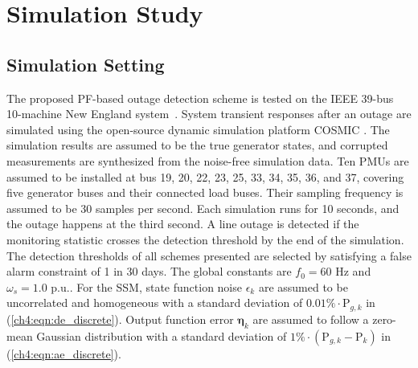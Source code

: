 \section{Simulation Study}
\label{ch4:sec:results}
\subsection{Simulation Setting}
The proposed PF-based outage detection scheme is tested on the IEEE 39-bus 10-machine New England system~\cite{athay1979practical}. System transient responses after an outage are simulated using the open-source dynamic simulation platform COSMIC \cite{Song2016}. The simulation results are assumed to be the true generator states, and corrupted measurements are synthesized from the noise-free simulation data. Ten PMUs are assumed to be installed at bus 19, 20, 22, 23, 25, 33, 34, 35, 36, and 37, covering five generator buses and their connected load buses. Their sampling frequency is assumed to be 30 samples per second. Each simulation runs for 10 seconds, and the outage happens at the third second. A line outage is detected if the monitoring statistic crosses the detection threshold by the end of the simulation. The detection thresholds of all schemes presented are selected by satisfying a false alarm constraint of 1 in 30 days. The global constants are $f_0 = 60 $ Hz and $\omega_s = 1.0 $ p.u.. For the SSM, state function noise $\epsilon_k$ are assumed to be uncorrelated and homogeneous with a standard deviation of $0.01\% \cdot \text{P}_{g,k}$ in (\ref{ch4:eqn:de_discrete}). Output function error $\boldsymbol{\eta}_k$ are assumed to follow a zero-mean Gaussian distribution with a standard deviation of 
$1\% \cdot (\text{P}_{g, k}- \text{P}_{k})$ in (\ref{ch4:eqn:ae_discrete}). 


